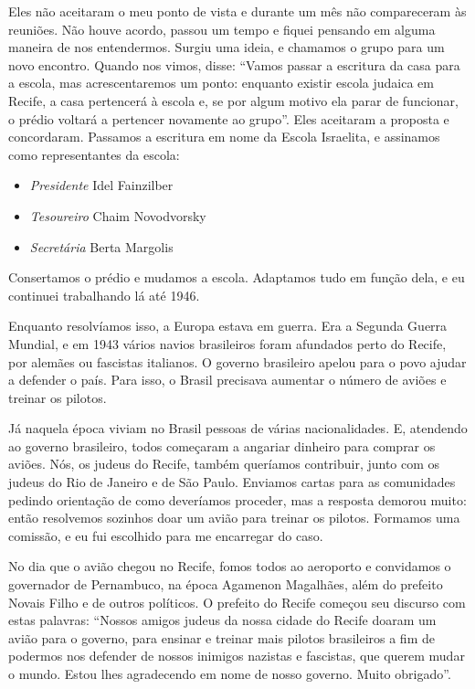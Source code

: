 Eles não aceitaram o meu ponto de vista e durante um mês não
compareceram às reuniões. Não houve acordo, passou
um tempo e fiquei pensando em alguma maneira de nos entendermos.
Surgiu uma ideia, e chamamos o grupo para um novo encontro. Quando nos
vimos, disse: ``Vamos passar a escritura da casa
para a escola, mas acrescentaremos um ponto: enquanto existir escola
judaica em Recife, a casa pertencerá à escola e, se por algum motivo
ela parar de funcionar, o prédio voltará a pertencer novamente ao
grupo''. Eles aceitaram a proposta e concordaram. Passamos a escritura
em nome da Escola Israelita, e assinamos como representantes da escola:

\begin{itemize}
\item \textit{Presidente} Idel Fainzilber
\item \textit{Tesoureiro} Chaim Novodvorsky
\item \textit{Secretária} Berta Margolis
\end{itemize}

Consertamos o prédio e mudamos a escola. Adaptamos tudo em função dela,
e eu continuei trabalhando lá até 1946.

Enquanto resolvíamos isso, a Europa estava em guerra. Era a Segunda Guerra Mundial, 
e em 1943 vários navios brasileiros foram
afundados perto do Recife, por alemães ou fascistas italianos. O governo
brasileiro apelou para o povo ajudar a defender o país. Para isso,
o Brasil precisava aumentar o número de aviões e treinar os pilotos.

Já naquela época viviam no Brasil pessoas de várias nacionalidades. E,
atendendo ao governo brasileiro, todos começaram a angariar dinheiro para
comprar os aviões. Nós, os judeus do Recife, também queríamos
contribuir, junto com os judeus do Rio de Janeiro e de São Paulo.
Enviamos cartas para as comunidades pedindo orientação de como
deveríamos proceder, mas a resposta demorou muito: então resolvemos
sozinhos doar um avião para treinar os pilotos. Formamos uma comissão, e
eu fui escolhido para me encarregar do caso.

No dia que o avião chegou no Recife, fomos todos ao aeroporto e
convidamos o governador de Pernambuco, na época Agamenon Magalhães, além do
prefeito Novais Filho e de outros políticos. O prefeito do
Recife começou seu discurso com estas palavras: ``Nossos amigos judeus
da nossa cidade do Recife doaram um avião para o governo, para
ensinar e treinar mais pilotos brasileiros a fim de podermos nos defender
de nossos inimigos nazistas e fascistas, que querem mudar o
mundo. Estou lhes agradecendo em nome de nosso governo. Muito obrigado''.


